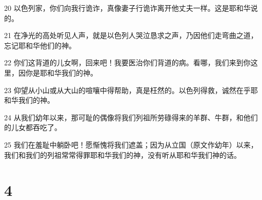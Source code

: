 \par 20 以色列家，你们向我行诡诈，真像妻子行诡诈离开他丈夫一样。这是耶和华说的。
\par 21 在净光的高处听见人声，就是以色列人哭泣恳求之声，乃因他们走弯曲之道，忘记耶和华他们的神。
\par 22 你们这背道的儿女啊，回来吧！我要医治你们背道的病。看哪，我们来到你这里，因你是耶和华我们的神。
\par 23 仰望从小山或从大山的喧嚷中得帮助，真是枉然的。以色列得救，诚然在乎耶和华我们的神。
\par 24 从我们幼年以来，那可耻的偶像将我们列祖所劳碌得来的羊群、牛群，和他们的儿女都吞吃了。
\par 25 我们在羞耻中躺卧吧！愿惭愧将我们遮盖；因为从立国（原文作幼年）以来，我们和我们的列祖常常得罪耶和华我们的神，没有听从耶和华我们神的话。

\chapter{4}

